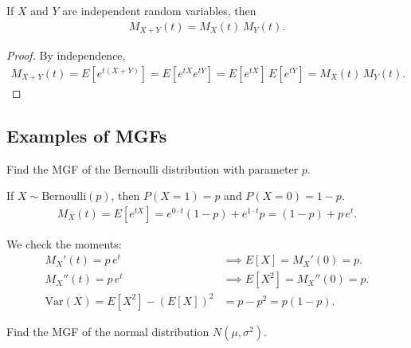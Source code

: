 \begin{teorema}
If $X$ and $Y$ are independent random variables, then
\begin{align}
 \label{eq:2.8.13}
 M_{X+Y}(t) = M_X(t)\,M_Y(t).
\end{align}
\end{teorema}

\begin{proof}
By independence,
\begin{align}
 M_{X+Y}(t) = E[e^{t(X+Y)}] = E[e^{tX}e^{tY}] = E[e^{tX}]\,E[e^{tY}] = M_X(t)\,M_Y(t).
\end{align}
\end{proof}

\subsection{Examples of MGFs}

\begin{ejemplo}
 \label{exmp:2.8.4}
Find the MGF of the Bernoulli distribution with parameter $p$.
\end{ejemplo}

\begin{solucion}
If $X \sim \text{Bernoulli}(p)$, then $P(X=1) = p$ and $P(X=0) = 1-p$.
\begin{align}
 M_X(t) = E[e^{tX}] = e^{0 \cdot t}(1-p) + e^{1 \cdot t}p
 = (1-p) + p\,e^t.
\end{align}

We check the moments:
\begin{align}
 M_X'(t) = p\,e^t &\implies E[X] = M_X'(0) = p. \\
 M_X''(t) = p\,e^t &\implies E[X^2] = M_X''(0) = p. \\
 \text{Var}(X) = E[X^2] - (E[X])^2 &= p - p^2 = p(1-p).
\end{align}
\end{solucion}

\begin{ejemplo}
 \label{exmp:2.8.5}
Find the MGF of the normal distribution $N(\mu, \sigma^2)$.
\end{ejemplo}

